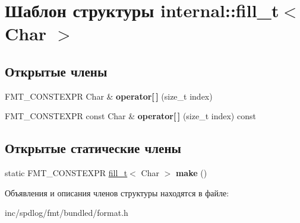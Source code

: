 \hypertarget{structinternal_1_1fill__t}{}\section{Шаблон структуры internal\+:\+:fill\+\_\+t$<$ Char $>$}
\label{structinternal_1_1fill__t}
\subsection*{Открытые члены}
\begin{DoxyCompactItemize}
\item 
\mbox{\label{structinternal_1_1fill__t_a0ee066116436af7b9477d47f8b1d73b2}} 
F\+M\+T\+\_\+\+C\+O\+N\+S\+T\+E\+X\+PR Char \& {\bfseries operator\mbox{[}$\,$\mbox{]}} (size\+\_\+t index)
\item 
\mbox{\label{structinternal_1_1fill__t_ab4b20f7eda62c2c50d04dcea4401b76c}} 
F\+M\+T\+\_\+\+C\+O\+N\+S\+T\+E\+X\+PR const Char \& {\bfseries operator\mbox{[}$\,$\mbox{]}} (size\+\_\+t index) const
\end{DoxyCompactItemize}
\subsection*{Открытые статические члены}
\begin{DoxyCompactItemize}
\item 
\mbox{\label{structinternal_1_1fill__t_a8632e412aca23be81d19a6a72af7b138}} 
static F\+M\+T\+\_\+\+C\+O\+N\+S\+T\+E\+X\+PR \hyperlink{structinternal_1_1fill__t}{fill\+\_\+t}$<$ Char $>$ {\bfseries make} ()
\end{DoxyCompactItemize}


Объявления и описания членов структуры находятся в файле\+:\begin{DoxyCompactItemize}
\item 
inc/spdlog/fmt/bundled/format.\+h\end{DoxyCompactItemize}
